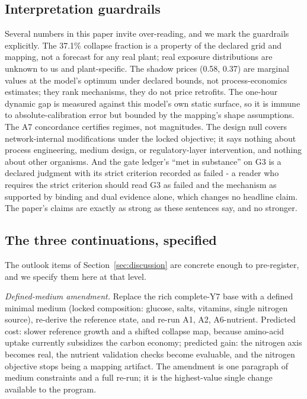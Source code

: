 \documentclass[12pt]{article}
\begin{document}
\subsection{Interpretation guardrails}

Several numbers in this paper invite over-reading, and we mark the
guardrails explicitly. The 37.1\% collapse fraction is a property of
the declared grid and mapping, not a forecast for any real plant;
real exposure distributions are unknown to us and plant-specific.
The shadow prices (0.58, 0.37) are marginal values at the model's
optimum under declared bounds, not process-economics estimates; they
rank mechanisms, they do not price retrofits. The one-hour dynamic
gap is measured against this model's own static surface, so it is
immune to absolute-calibration error but bounded by the mapping's
shape assumptions. The A7 concordance certifies regimes, not
magnitudes. The design null covers network-internal modifications
under the locked objective; it says nothing about process
engineering, medium design, or regulatory-layer intervention, and
nothing about other organisms. And the gate ledger's ``met in
substance'' on G3 is a declared judgment with its strict criterion
recorded as failed - a reader who requires the strict criterion
should read G3 as failed and the mechanism as supported by binding
and dual evidence alone, which changes no headline claim. The paper's
claims are exactly as strong as these sentences say, and no stronger.

\subsection{The three continuations, specified}

The outlook items of Section~\ref{sec:discussion} are concrete enough
to pre-register, and we specify them here at that level.

\emph{Defined-medium amendment.} Replace the rich complete-Y7 base with
a defined minimal medium (locked composition: glucose, salts,
vitamins, single nitrogen source), re-derive the reference state, and
re-run A1, A2, A6-nutrient. Predicted cost: slower reference growth
and a shifted collapse map, because amino-acid uptake currently
subsidizes the carbon economy; predicted gain: the nitrogen axis
becomes real, the nutrient validation checks become evaluable, and
the nitrogen objective stops being a mapping artifact. The amendment
is one paragraph of medium constraints and a full re-run; it is the
highest-value single change available to the program.
\end{document}

